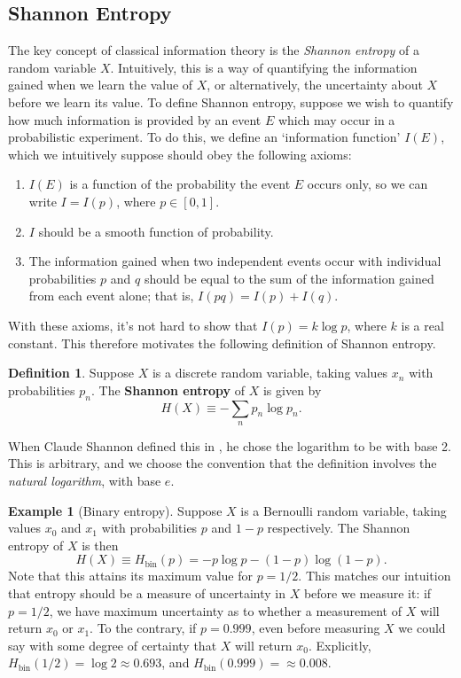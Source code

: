 \documentclass[12pt,a4paper]{report}
\numberwithin{equation}{section}
\theoremstyle{definition}
\newtheorem{definition}{Definition}[section]
\theoremstyle{theorem}
\theoremstyle{theorem}
\theoremstyle{example}
\newtheorem{example}{Example}[section]
\theoremstyle{definition}
\begin{document}
\subsection{Shannon Entropy}
The key concept of classical information theory is the \textit{Shannon entropy} of a random variable $X$. Intuitively, this is a way of quantifying the information gained when we learn the value of $X$, or alternatively, the uncertainty about $X$ before we learn its value. To define Shannon entropy, suppose we wish to quantify how much information is provided by an event $E$ which may occur in a probabilistic experiment. To do this, we define an `information function' $I(E)$, which we intuitively suppose should obey the following axioms:
\begin{enumerate}
	\item $I(E)$ is a function of the probability the event $E$ occurs only, so we can write $I=I(p)$, where $p\in[0,1]$.
	\item $I$ should be a smooth function of probability.
	\item The information gained when two independent events occur with individual probabilities $p$ and $q$ should be equal to the sum of the information gained from each event alone; that is, $I(pq)=I(p)+I(q)$.
\end{enumerate}
With these axioms, it's not hard to show that $I(p)=k\log{p}$, where $k$ is a real constant. This therefore motivates the following definition of Shannon entropy.
\begin{definition}
	Suppose $X$ is a discrete random variable, taking values $x_{n}$ with probabilities $p_{n}$. The \textbf{Shannon entropy} of $X$ is given by
	\begin{equation}
		H(X)\equiv-\sum_{n}p_{n}\log{p_{n}}.
	\end{equation}
\end{definition}
When Claude Shannon defined this in \cite{6773024}, he chose the logarithm to be with base 2. This is arbitrary, and we choose the convention that the definition involves the \textit{natural logarithm}, with base $e$.
\begin{example}[Binary entropy]
	Suppose $X$ is a Bernoulli random variable, taking values $x_{0}$ and $x_{1}$ with probabilities $p$ and $1-p$ respectively. The Shannon entropy of $X$ is then
	\begin{equation}
		H(X)\equiv H_{\text{bin}}(p)=-p\log{p}-(1-p)\log{(1-p)}.
	\end{equation}
	Note that this attains its maximum value for $p=1/2$. This matches our intuition that entropy should be a measure of uncertainty in $X$ before we measure it: if $p=1/2$, we have maximum uncertainty as to whether a measurement of $X$ will return $x_{0}$ or $x_{1}$. To the contrary, if $p=0.999$, even before measuring $X$ we could say with some degree of certainty that $X$ will return $x_{0}$. Explicitly, $H_{\text{bin}}(1/2)=\log{2}\approx 0.693$, and $H_{\text{bin}}(0.999)=\approx 0.008$.
\end{example}
\end{document}
